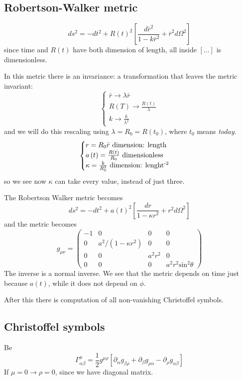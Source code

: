 \subsection{Robertson-Walker metric}
\[
	ds^{2} = -dt^{2} + R\left( t \right)^{2}\left[ \frac{d\bar{r}^{2}}{1 - k \bar{r}^{2}} + \bar{r}^{2}d\Omega ^{2} \right]
\]
since time and $R\left( t \right)$ have both dimension of length, all inside $\left[ \ldots  \right]$ is dimensionless.\par
In this metric there is an invariance: a transformation that leaves the metric invariant:
\[
\begin{cases}
	\bar{r} \to \lambda \bar{r} \\
R\left( T \right) \to \frac{R\left( t \right)}{\lambda } \\
k \to  \frac{k}{\lambda ^{2}}
\end{cases}
\]
and we will do this rescaling using $\lambda = R_{0} = R\left( t_{0} \right)$, where $t_{0}$ means \emph{today}.
\[
\begin{cases}
	r = R_{0}\bar{r}  \text{ dimension: length }\\	
a\left( t \right) = \frac{R\left( t \right)}{R_{0}} \text{ dimensionless }\\
\kappa = \frac{k}{R_{0}^{2}} \text{ dimension: lenght\textsuperscript{-2} }
\end{cases}
\]
so we see now $\kappa $ can take every value, instead of just three.\par
The Robertson Walker metric becomes
\[
ds^{2} = -dt^{2} + a\left( t \right)^{2}\left[ \frac{dr}{1- \kappa r^{2}} + r^{2} d\Omega ^{2} \right]
\]
and the metric becomes
\[
g_{\mu \nu  } = \begin{pmatrix}
-1 & 0 & 0 & 0 \\
0 & a^{2}/\left( 1- \kappa r^{2} \right) & 0 & 0 \\
0 & 0 & a^{2}r^{2} & 0 \\
0 & 0 & 0 & a^{2}r^{2}\text{sin}^{2}\theta 
\end{pmatrix} 
\]
The inverse is a normal inverse. We see that the metric depends on time just because $a\left( t \right)$, while it does not depend on $\phi $.

After this there is computation of all non-vanishing Christoffel symbols.

\subsection{Christoffel symbols}
Be
\[
\Gamma^{\mu }_{\alpha \beta } = \frac{1}{2} g^{\mu \rho } \left[ \partial_{\alpha }g_{\beta \rho } + \partial_{\beta }g_{\rho \alpha } - \partial_{\rho }g_{\alpha \beta } \right]
\]
If $\mu  = 0 \to \rho = 0$, since we have diagonal matrix.

